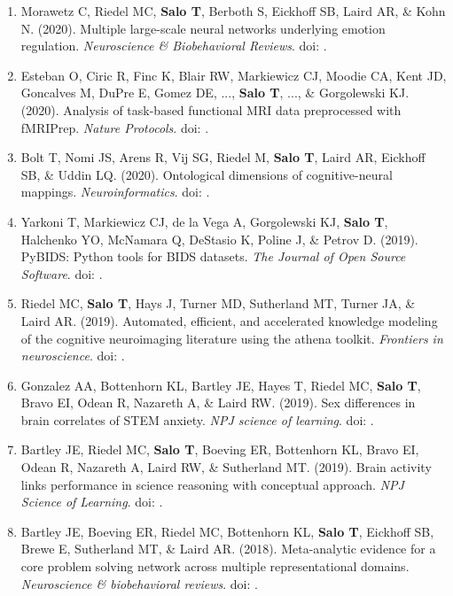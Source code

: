 \documentclass[10pt]{article}
\newcommand{\doi}[1]{doi: \textlink{https://doi.org/#1}{#1}}
\newcommand{\textlink}[3][blue]{\href{#2}{\color{#1}{#3}}}
\begin{document}
\begin{enumerate}
	\item Morawetz C, Riedel MC, \textbf{Salo T}, Berboth S, Eickhoff SB, Laird AR, \& Kohn N.
	(2020).
	Multiple large-scale neural networks underlying emotion regulation.
	\emph{Neuroscience \& Biobehavioral Reviews}.
	\doi{10.1016/j.neubiorev.2020.07.001}.

	\item Esteban O, Ciric R, Finc K, Blair RW, Markiewicz CJ, Moodie CA, Kent JD, Goncalves M, DuPre E, Gomez DE, ..., \textbf{Salo T}, ..., \& Gorgolewski KJ.
	(2020).
	Analysis of task-based functional MRI data preprocessed with fMRIPrep.
	\emph{Nature Protocols}.
	\doi{10.1038/s41596-020-0327-3}.

	\item Bolt T, Nomi JS, Arens R, Vij SG, Riedel M, \textbf{Salo T}, Laird AR, Eickhoff SB, \& Uddin LQ.
	(2020).
	Ontological dimensions of cognitive-neural mappings.
	\emph{Neuroinformatics}.
	\doi{10.1007/s12021-020-09454-y}.

	\item Yarkoni T, Markiewicz CJ, de la Vega A, Gorgolewski KJ, \textbf{Salo T}, Halchenko YO, McNamara Q, DeStasio K, Poline J, \& Petrov D.
	(2019).
	PyBIDS: Python tools for BIDS datasets.
	\emph{The Journal of Open Source Software}.
	\doi{10.21105/joss.01294}.

	\item Riedel MC, \textbf{Salo T}, Hays J, Turner MD, Sutherland MT, Turner JA, \& Laird AR.
	(2019).
	Automated, efficient, and accelerated knowledge modeling of the cognitive neuroimaging literature using the athena toolkit.
	\emph{Frontiers in neuroscience}.
	\doi{10.3389/fnins.2019.00494}.

	\item Gonzalez AA, Bottenhorn KL, Bartley JE, Hayes T, Riedel MC, \textbf{Salo T}, Bravo EI, Odean R, Nazareth A, \& Laird RW.
	(2019).
	Sex differences in brain correlates of STEM anxiety.
	\emph{NPJ science of learning}.
	\doi{10.1038/s41539-019-0058-9}.

	\item Bartley JE, Riedel MC, \textbf{Salo T}, Boeving ER, Bottenhorn KL, Bravo EI, Odean R, Nazareth A, Laird RW, \& Sutherland MT.
	(2019).
	Brain activity links performance in science reasoning with conceptual approach.
	\emph{NPJ Science of Learning}.
	\doi{10.1038/s41539-019-0059-8}.

	\item Bartley JE, Boeving ER, Riedel MC, Bottenhorn KL, \textbf{Salo T}, Eickhoff SB, Brewe E, Sutherland MT, \& Laird AR.
	(2018).
	Meta-analytic evidence for a core problem solving network across multiple representational domains.
	\emph{Neuroscience \& biobehavioral reviews}.
	\doi{10.1016/j.neubiorev.2018.06.009}.


\end{enumerate}
\end{document}

